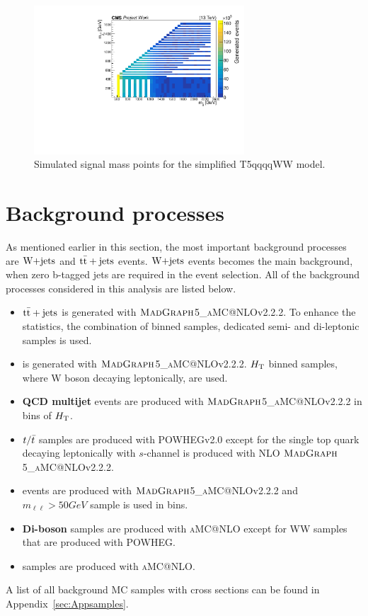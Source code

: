 \begin{figure}[!h]
  \includegraphics[width=0.7\textwidth]{Plots/signals/signal_scan.pdf}
\centering
  \caption{\label{fig:massplane} Simulated signal mass points for the simplified T5qqqqWW model.
  }
\end{figure}
\section{Background processes}
\label{sec:bkg_proc}
As mentioned earlier in this section, the most important background processes are $\textrm{W+jets}$ and ${\rm t\bar{t}+jets}$ events. $\textrm{W+jets}$ events becomes the main background, when zero b-tagged jets are required in the event selection. All of the background processes considered in this analysis are listed below.
\begin{itemize}
\item {\boldmath ${\rm t\bar{t}+jets}$} is generated with $\textsc{MadGraph}$5\_\textsc{aMC@}NLOv2.2.2. To enhance the statistics, the combination of {\HT} binned samples, dedicated semi- and di-leptonic samples is used.
\item {\bf \wJets} is generated with $\textsc{MadGraph}$5\_\textsc{aMC@}NLOv2.2.2. $H_{\rm T}$ binned samples, where W boson decaying leptonically, are used.
\item \textbf{QCD multijet} events are produced with $\textsc{MadGraph}$5\_\textsc{aMC@}NLOv2.2.2 in bins of $H_{\rm T}$.
\item {\boldmath $t/\bar{t}$} samples are produced with POWHEGv2.0 except for the single top quark decaying leptonically with $s$-channel is produced with NLO $\textsc{MadGraph}$5\_\textsc{aMC@}NLOv2.2.2.
\item \textbf{\DY} events are produced with $\textsc{MadGraph}$5\_\textsc{aMC@}NLOv2.2.2 and $m_{\ell\ell}>50 GeV$ sample is used in {\HT} bins.
\item \textbf{Di-boson} samples are produced with \textsc{aMC@}NLO except for WW samples that are produced with POWHEG.
\item {\boldmath \TTVH} samples are produced with \textsc{aMC@}NLO.
\end{itemize}
A list of all background MC samples with cross sections can be found in Appendix~\ref{sec:Appsamples}.

